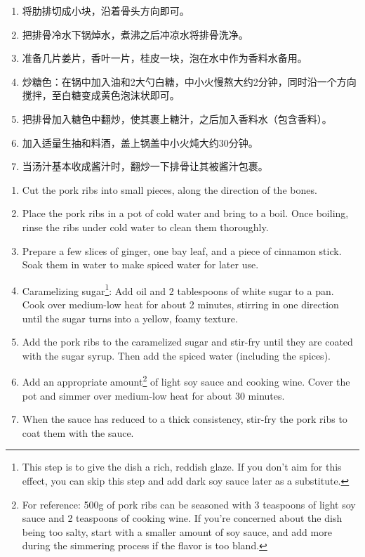 \documentclass{article}
\newcommand{\chn}[1]{\foreignlanguage{chinese-simplified}{#1}}
\begin{document}
\begin{paracol}{2}
    \begin{enumerate}
        \item \foreignlanguage{chinese-simplified}{将肋排切成小块，沿着骨头方向即可。}
        \item \chn{把排骨冷水下锅焯水，煮沸之后冲凉水将排骨洗净。}
        \item \chn{准备几片姜片，香叶一片，桂皮一块，泡在水中作为香料水备用。}
        \item \chn{炒糖色：在锅中加入油和2大勺白糖，中小火慢熬大约2分钟，同时沿一个方向搅拌，至白糖变成黄色泡沫状即可。}
        \item \chn{把排骨加入糖色中翻炒，使其裹上糖汁，之后加入香料水（包含香料）。}
        \item \chn{加入适量生抽和料酒，盖上锅盖中小火炖大约30分钟。}
        \item \chn{当汤汁基本收成酱汁时，翻炒一下排骨让其被酱汁包裹。}
    \end{enumerate}
    
    \switchcolumn
    \begin{enumerate}
        \item Cut the pork ribs into small pieces, along the direction of the bones.
        \item Place the pork ribs in a pot of cold water and bring to a boil. 
        Once boiling, rinse the ribs under cold water to clean them thoroughly.
        \item Prepare a few slices of ginger, one bay leaf, and a piece of cinnamon stick. 
        Soak them in water to make spiced water for later use.
        \item Caramelizing sugar\footnote{This step is to give the dish a rich, reddish glaze. If you don't aim for this effect, you can skip this step and add dark soy sauce later as a substitute.}: 
        Add oil and 2 tablespoons of white sugar to a pan. 
        Cook over medium-low heat for about 2 minutes, stirring in one direction until the sugar turns into a yellow, foamy texture.
        \item Add the pork ribs to the caramelized sugar and stir-fry until they are coated with the sugar syrup. 
        Then add the spiced water (including the spices).
        \item Add an appropriate amount\footnote{For reference: 500g of pork ribs can be seasoned with 3 teaspoons of light soy sauce and 2 teaspoons of cooking wine. If you're concerned about the dish being too salty, start with a smaller amount of soy sauce, and add more during the simmering process if the flavor is too bland.} 
        of light soy sauce and cooking wine. 
        Cover the pot and simmer over medium-low heat for about 30 minutes.
        \item When the sauce has reduced to a thick consistency, stir-fry the pork ribs to coat them with the sauce.
    \end{enumerate}
\end{paracol}
\end{document}
